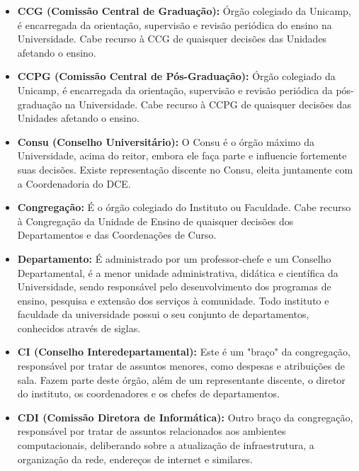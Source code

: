 \begin{itemize}
    \item  \textbf{CCG (Comissão Central de Graduação):} Órgão colegiado da
    Unicamp, é encarregada da orientação, supervisão e revisão periódica do
    ensino na Universidade. Cabe recurso à CCG de quaisquer decisões das
    Unidades afetando o ensino.

    \item  \textbf{CCPG (Comissão Central de Pós-Graduação):} Órgão colegiado da
    Unicamp, é encarregada da orientação, supervisão e revisão periódica da
    pós-graduação na Universidade. Cabe recurso à CCPG de quaisquer decisões das
    Unidades afetando o ensino.

    \item  \textbf{Consu (Conselho Universitário):} O Consu é o órgão máximo da
    Universidade, acima do reitor, embora ele faça parte e influencie
    fortemente suas decisões.  Existe representação discente no Consu, eleita
    juntamente com a Coordenadoria do DCE.

    \item  \textbf{Congregação:} É o órgão colegiado do Instituto ou Faculdade.
    Cabe recurso à Congregação da Unidade de Ensino de quaisquer decisões dos
    Departamentos e das Coordenações de Curso.

    \item  \textbf{Departamento:} É administrado por um professor-chefe e um
    Conselho Departamental, é a menor unidade administrativa, didática
    e científica da Universidade, sendo responsável pelo desenvolvimento dos
    programas de ensino, pesquisa e extensão dos serviços à comunidade. Todo
    instituto e faculdade da universidade possui o seu conjunto de
    departamentos, conhecidos através de siglas.

    \item  \textbf{CI (Conselho Interedepartamental):} Este é um "braço" da
    congregação, responsável por tratar de assuntos menores, como despesas
    e atribuições de sala. Fazem parte deste órgão, além de um representante
    discente, o diretor do instituto, os coordenadores e os chefes de
    departamentos.

    \item  \textbf{CDI (Comissão Diretora de Informática):} Outro braço da
    congregação, responsável por tratar de assuntos relacionados aos ambientes
    computacionais, deliberando sobre a atualização de infraestrutura,
    a organização da rede, endereços de internet e similares.


\end{itemize}
